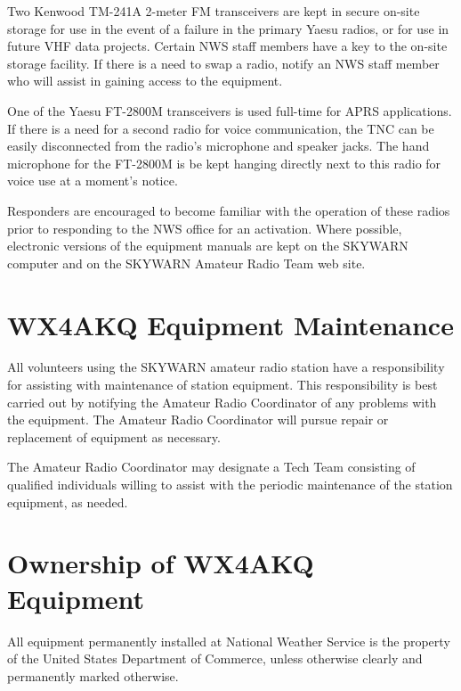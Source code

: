 \documentclass[pdflatex,letterpaper,twoside,12pt]{book}
\begin{document}
Two Kenwood TM-241A 2-meter FM transceivers are kept in secure on-site storage for use in the event of a failure in the primary Yaesu radios, or for use in future VHF data projects.  Certain NWS staff members have a key to the on-site storage facility.  If there is a need to swap a radio, notify an NWS staff member who will assist in gaining access to the equipment. 

One of the Yaesu FT-2800M transceivers is used full-time for APRS applications.  If there is a need for a second radio for voice communication, the TNC can be easily disconnected from the radio's microphone and speaker jacks.  The hand microphone for the FT-2800M is be kept hanging directly next to this radio for voice use at a moment's notice. 

Responders are encouraged to become familiar with the operation of these radios prior to responding to the NWS office for an activation.  Where possible, electronic versions of the equipment manuals are kept on the SKYWARN computer and on the SKYWARN Amateur Radio Team web site.


\section{WX4AKQ Equipment Maintenance}\label{wx4akq-maint}

All volunteers using the SKYWARN amateur radio station have a responsibility for assisting with maintenance of station equipment.  This responsibility is best carried out by notifying the Amateur Radio Coordinator of any problems with the equipment.  The Amateur Radio Coordinator will pursue repair or replacement of equipment as necessary. 

The Amateur Radio Coordinator may designate a Tech Team consisting of qualified individuals willing to assist with the periodic maintenance of the station equipment, as needed.


\section{Ownership of WX4AKQ Equipment}

All equipment permanently installed at National Weather Service is the property of the United States Department of Commerce, unless otherwise clearly and permanently marked otherwise. 
\end{document}
